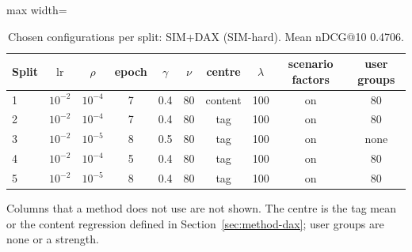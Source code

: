 \begin{table}[tbp]
\centering
\footnotesize
\caption{Chosen configurations per split: SIM+DAX (SIM-hard). Mean nDCG@10 0.4706.}
\label{tab:grid11}
\begin{adjustbox}{max width=\linewidth}
\begin{tabular}{lccccccccc}
\toprule
Split & $\mathrm{lr}$ & $\rho$ & epoch & $\gamma$ & $\nu$ & centre & $\lambda$ & scenario factors & user groups \\
\midrule
1 & $10^{-2}$ & $10^{-4}$ & 7 & 0.4 & 80 & content & 100 & on & 80 \\
2 & $10^{-2}$ & $10^{-4}$ & 7 & 0.4 & 80 & tag & 100 & on & 80 \\
3 & $10^{-2}$ & $10^{-5}$ & 8 & 0.5 & 80 & tag & 100 & on & none \\
4 & $10^{-2}$ & $10^{-4}$ & 5 & 0.4 & 80 & tag & 100 & on & 80 \\
5 & $10^{-2}$ & $10^{-5}$ & 8 & 0.4 & 80 & tag & 100 & on & 80 \\
\bottomrule
\end{tabular}
\end{adjustbox}
\par\smallskip
\begin{minipage}{\linewidth}\raggedright\footnotesize Columns that a method does not use are not shown. The centre is the tag mean or the content regression defined in Section~\ref{sec:method-dax}; user groups are none or a strength.\end{minipage}
\end{table}
